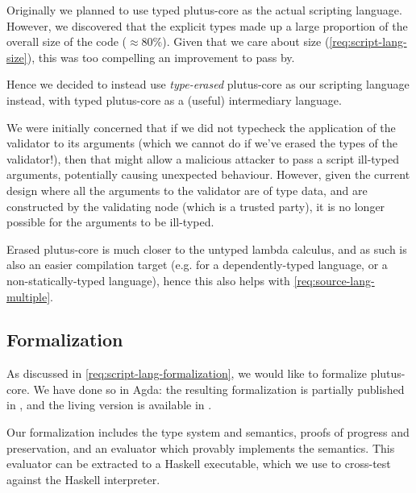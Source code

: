 Originally we planned to use typed \gls{plutus-core} as the actual scripting language.
However, we discovered that the explicit types made up a large proportion of the overall size of the code ($\approx 80\%$).
Given that we care about size (\cref{req:script-lang-size}), this was too compelling an improvement to pass by.

Hence we decided to instead use \emph{type-erased} \gls{plutus-core} as our scripting language instead, with typed \gls{plutus-core} as a (useful) intermediary language.

We were initially concerned that if we did not typecheck the application of the \gls{validator} to its arguments (which we cannot do if we've erased the types of the \gls{validator}!), then that might allow a malicious attacker to pass a script ill-typed arguments, potentially causing unexpected behaviour.
However, given the current design where all the arguments to the \gls{validator} are of type \gls{data}, and are constructed by the validating node (which is a trusted party), it is no longer possible for the arguments to be ill-typed.

Erased \gls{plutus-core} is much closer to the untyped lambda calculus, and as such is also an easier compilation target (e.g. for a dependently-typed language, or a non-statically-typed language), hence this also helps with \cref{req:source-lang-multiple}.

\subsection{Formalization}

As discussed in \cref{req:script-lang-formalization}, we would like to formalize \gls{plutus-core}.
We have done so in Agda: the resulting formalization is partially published in \textcite{chapman2019system}, and the living version is available in \textcite{plutus-repo}.

Our formalization includes the type system and semantics, proofs of progress and preservation, and an evaluator which provably implements the semantics.
This evaluator can be extracted to a Haskell executable, which we use to cross-test against the Haskell interpreter.
